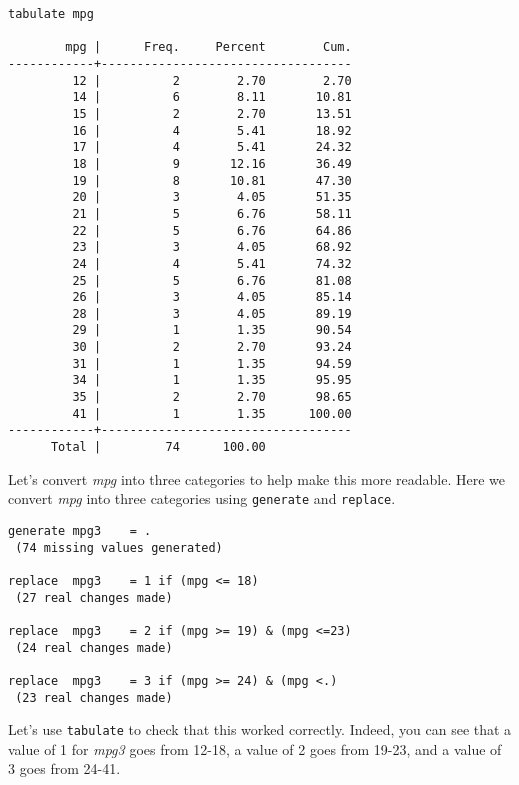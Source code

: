 \begin{lstlisting}
tabulate mpg

        mpg |      Freq.     Percent        Cum.
------------+-----------------------------------
         12 |          2        2.70        2.70
         14 |          6        8.11       10.81
         15 |          2        2.70       13.51
         16 |          4        5.41       18.92
         17 |          4        5.41       24.32
         18 |          9       12.16       36.49
         19 |          8       10.81       47.30
         20 |          3        4.05       51.35
         21 |          5        6.76       58.11
         22 |          5        6.76       64.86
         23 |          3        4.05       68.92
         24 |          4        5.41       74.32
         25 |          5        6.76       81.08
         26 |          3        4.05       85.14
         28 |          3        4.05       89.19
         29 |          1        1.35       90.54
         30 |          2        2.70       93.24
         31 |          1        1.35       94.59
         34 |          1        1.35       95.95
         35 |          2        2.70       98.65
         41 |          1        1.35      100.00
------------+-----------------------------------
      Total |         74      100.00
\end{lstlisting}

Let's convert \textit{mpg} into three categories to help make this more readable. Here we convert \textit{mpg} into three categories using \lstinline{generate} and \lstinline{replace}.

\begin{lstlisting}
generate mpg3    = .
 (74 missing values generated)

replace  mpg3    = 1 if (mpg <= 18)
 (27 real changes made)

replace  mpg3    = 2 if (mpg >= 19) & (mpg <=23)
 (24 real changes made)

replace  mpg3    = 3 if (mpg >= 24) & (mpg <.)
 (23 real changes made)
\end{lstlisting}

Let's use \lstinline{tabulate} to check that this worked correctly. Indeed, you can see that a value of 1 for \textit{mpg3} goes from 12-18, a value of 2 goes from 19-23, and a value of 3 goes from 24-41.


